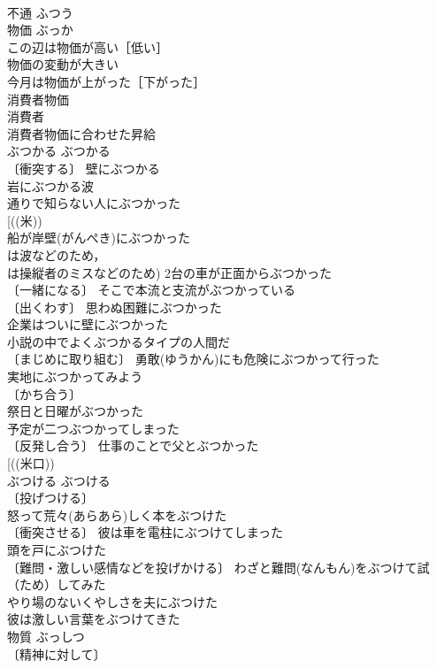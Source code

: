 \documentclass[8pt]{extreport}
\begin{document}
\begin{CJK}{UTF8}{min}
\\	不通	ふつう	
\\	物価	ぶっか	
\\	この辺は物価が高い［低い］ 
\\	物価の変動が大きい 
\\	今月は物価が上がった［下がった］ 
\\	消費者物価 
\\	消費者　
\\	消費者物価に合わせた昇給 
\\	ぶつかる	ぶつかる	
\\	〔衝突する〕 壁にぶつかる 
\\	岩にぶつかる波 
\\	通りで知らない人にぶつかった 
\\	[((米)) 
\\	船が岸壁(がんぺき)にぶつかった 
\\	は波などのため，
\\	は操縦者のミスなどのため) 2台の車が正面からぶつかった 
\\	〔一緒になる〕 そこで本流と支流がぶつかっている 
\\	〔出くわす〕 思わぬ困難にぶつかった 
\\	企業はついに壁にぶつかった 
\\	小説の中でよくぶつかるタイプの人間だ 
\\	〔まじめに取り組む〕 勇敢(ゆうかん)にも危険にぶつかって行った 
\\	実地にぶつかってみよう 
\\	〔かち合う〕
\\	祭日と日曜がぶつかった 
\\	予定が二つぶつかってしまった 
\\	〔反発し合う〕 仕事のことで父とぶつかった 
\\	[((米口))
\\	ぶつける	ぶつける	
\\	〔投げつける〕
\\	怒って荒々(あらあら)しく本をぶつけた 
\\	〔衝突させる〕 彼は車を電柱にぶつけてしまった 
\\	頭を戸にぶつけた 
\\	〔難問・激しい感情などを投げかける〕 わざと難問(なんもん)をぶつけて試（ため）してみた 
\\	やり場のないくやしさを夫にぶつけた 
\\	彼は激しい言葉をぶつけてきた 
\\	物質	ぶっしつ	
\\	〔精神に対して〕

\end{CJK}
\end{document}
